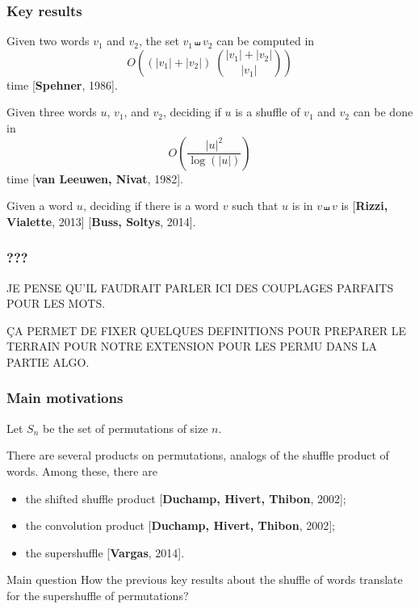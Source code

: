 \documentclass[unknownkeysallowed,10pt,xcolor={dvipsnames}]{beamer}
\newcommand{\BIB}[2]{{\footnotesize\textcolor{MidnightBlue!85}{[\textbf{#1}, #2]}}}
\begin{document}

\begin{frame}
  \frametitle{Key results}

Given two words $v_1$ and $v_2$, the set $v_1 \shuffle v_2$
can be computed in
\begin{equation*}
    O\left((|v_1| + |v_2|) \; \binom{|v_1| + |v_2|}{|v_1|}\right)
\end{equation*}
time \BIB{Spehner}{1986}.
\bigskip

Given three words $u$, $v_1$, and $v_2$, deciding if $u$ is a
shuffle of $v_1$ and $v_2$ can be done in
\begin{equation*}
O\left(\frac{|u|^2}{\log(|u|)}\right)
\end{equation*}
time \BIB{van Leeuwen, Nivat}{1982}.
\bigskip

Given a word $u$, deciding if there is a word $v$ such that $u$ is
in $v \shuffle v$ is \NPC{} \BIB{Rizzi, Vialette}{2013}
\BIB{Buss, Soltys}{2014}.
\end{frame}

\begin{frame} \frametitle{???}
JE PENSE QU'IL FAUDRAIT PARLER ICI DES COUPLAGES PARFAITS POUR LES MOTS.
\medskip

ÇA PERMET DE FIXER QUELQUES DEFINITIONS POUR PREPARER LE TERRAIN POUR
NOTRE EXTENSION POUR LES PERMU DANS LA PARTIE ALGO.
\end{frame}

\begin{frame} \frametitle{Main motivations}
Let $S_n$ be the set of permutations of size $n$.
\medskip

There are several products on permutations, analogs of the shuffle
product of words. Among these, there are
\begin{itemize}
    \item the shifted shuffle product \BIB{Duchamp, Hivert, Thibon}{2002};
    \medskip

    \item the convolution product \BIB{Duchamp, Hivert, Thibon}{2002};
    \medskip

    \item the supershuffle \BIB{Vargas}{2014}.
\end{itemize}
\medskip

\begin{block}{Main question}
    How the previous key results about the shuffle of words translate
    for the supershuffle of permutations?
\end{block}
\end{frame}
\end{document}
